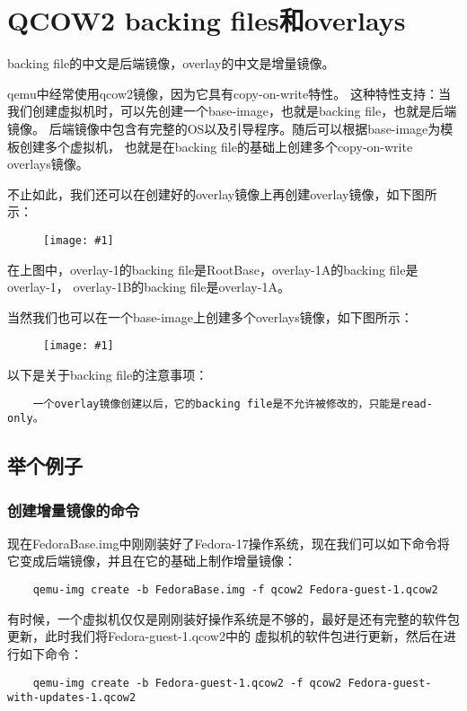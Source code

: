 \documentclass[a4paper,left=1.5cm,right=1.5cm,11pt]{article}
\newcommand{\fic}[1]{\begin{figure}[H]
		\center
		\texttt{[image: \#1]}
	\end{figure}}
\begin{document}
\tableofcontents

\clearpage
\section{QCOW2 backing files和overlays}
    backing file的中文是后端镜像，overlay的中文是增量镜像。\par

    qemu中经常使用qcow2镜像，因为它具有copy-on-write特性。
    这种特性支持：当我们创建虚拟机时，可以先创建一个base-image，也就是backing file，也就是后端镜像。
    后端镜像中包含有完整的OS以及引导程序。随后可以根据base-image为模板创建多个虚拟机，
    也就是在backing file的基础上创建多个copy-on-write overlays镜像。\par

    不止如此，我们还可以在创建好的overlay镜像上再创建overlay镜像，如下图所示：
    \fic{1.png}

    在上图中，overlay-1的backing file是RootBase，overlay-1A的backing file是overlay-1，
    overlay-1B的backing file是overlay-1A。\par

    当然我们也可以在一个base-image上创建多个overlays镜像，如下图所示：
    \fic{2.png}

    以下是关于backing file的注意事项：
    \begin{lstlisting}
    一个overlay镜像创建以后，它的backing file是不允许被修改的，只能是read-only。
    \end{lstlisting}

\subsection{举个例子}
\subsubsection{创建增量镜像的命令}
    现在FedoraBase.img中刚刚装好了Fedora-17操作系统，现在我们可以如下命令将它变成后端镜像，并且在它的基础上制作增量镜像：
    \begin{lstlisting}
    qemu-img create -b FedoraBase.img -f qcow2 Fedora-guest-1.qcow2
    \end{lstlisting}

    有时候，一个虚拟机仅仅是刚刚装好操作系统是不够的，最好是还有完整的软件包更新，此时我们将Fedora-guest-1.qcow2中的
    虚拟机的软件包进行更新，然后在进行如下命令：
    \begin{lstlisting}
    qemu-img create -b Fedora-guest-1.qcow2 -f qcow2 Fedora-guest-with-updates-1.qcow2
    \end{lstlisting}
\end{document}
